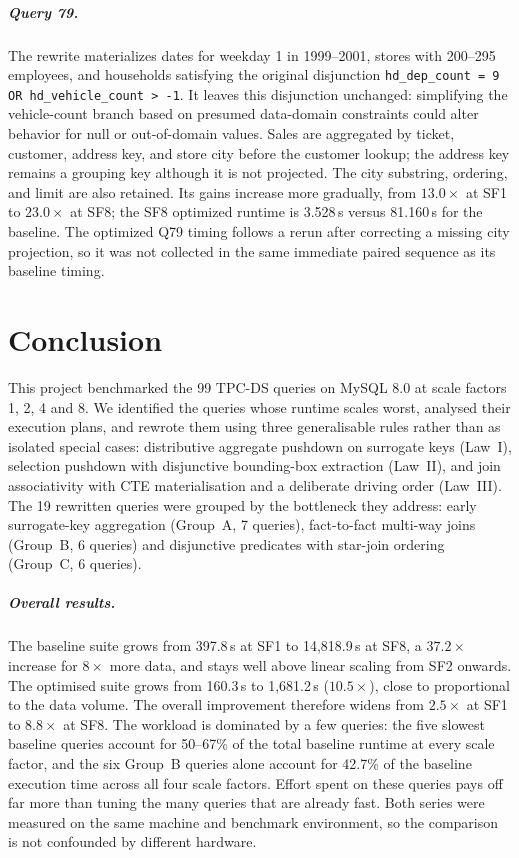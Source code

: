 \documentclass{ULBreport}
\begin{document}
\paragraph{Query 79.} The rewrite materializes dates for weekday 1 in 1999--2001, stores with 200--295 employees, and households satisfying the original disjunction \texttt{hd\_dep\_count = 9 OR hd\_vehicle\_count > -1}. It leaves this disjunction unchanged: simplifying the vehicle-count branch based on presumed data-domain constraints could alter behavior for null or out-of-domain values. Sales are aggregated by ticket, customer, address key, and store city before the customer lookup; the address key remains a grouping key although it is not projected. The city substring, ordering, and limit are also retained. Its gains increase more gradually, from $13.0\times$ at SF1 to $23.0\times$ at SF8; the SF8 optimized runtime is 3.528\,s versus 81.160\,s for the baseline. The optimized Q79 timing follows a rerun after correcting a missing city projection, so it was not collected in the same immediate paired sequence as its baseline timing.

\chapter{Conclusion}

This project benchmarked the 99 TPC-DS queries on MySQL 8.0 at scale factors 1, 2, 4 and 8. We identified the queries whose runtime scales worst, analysed their execution plans, and rewrote them using three generalisable rules rather than as isolated special cases: distributive aggregate pushdown on surrogate keys (Law~I), selection pushdown with disjunctive bounding-box extraction (Law~II), and join associativity with CTE materialisation and a deliberate driving order (Law~III). The 19 rewritten queries were grouped by the bottleneck they address: early surrogate-key aggregation (Group~A, 7 queries), fact-to-fact multi-way joins (Group~B, 6 queries) and disjunctive predicates with star-join ordering (Group~C, 6 queries).

\paragraph{Overall results.}
The baseline suite grows from 397.8\,s at SF1 to 14,818.9\,s at SF8, a $37.2\times$ increase for $8\times$ more data, and stays well above linear scaling from SF2 onwards. The optimised suite grows from 160.3\,s to 1,681.2\,s ($10.5\times$), close to proportional to the data volume. The overall improvement therefore widens from $2.5\times$ at SF1 to $8.8\times$ at SF8. The workload is dominated by a few queries: the five slowest baseline queries account for 50--67\% of the total baseline runtime at every scale factor, and the six Group~B queries alone account for 42.7\% of the baseline execution time across all four scale factors. Effort spent on these queries pays off far more than tuning the many queries that are already fast. Both series were measured on the same machine and benchmark environment, so the comparison is not confounded by different hardware.
\end{document}
